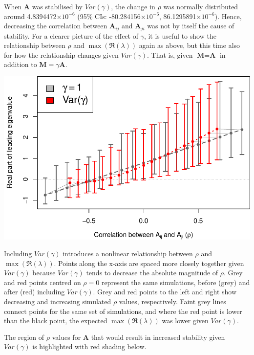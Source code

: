 \documentclass[]{article}
\begin{document}
When \(\textbf{A}\) was stabilised by \(Var(\gamma)\), the change in
\(\rho\) was normally distributed around 4.8394472\(\times 10^{-6}\)
(95\% CIs: -80.284156\(\times 10^{-6}\), 86.1295891\(\times 10^{-6}\)).
Hence, decreasing the correlation between \(\textbf{A}_{ij}\) and
\(\textbf{A}_{ji}\) was not by itself the cause of stability. For a
clearer picture of the effect of \(\gamma\), it is useful to show the
relationship between \(\rho\) and \(\max(\Re(\lambda))\) again as above,
but this time also for how the relationship changes given
\(Var(\gamma)\). That is, given \(\textbf{M} = \textbf{A}\) in addition
to \(\textbf{M} = \gamma\textbf{A}\).

\includegraphics{revision_notes_files/figure-latex/unnamed-chunk-11-1.pdf}

Including \(Var(\gamma)\) introduces a nonlinear relationship between
\(\rho\) and \(\max(\Re(\lambda))\). Points along the x-axis are spaced
more closely together given \(Var(\gamma)\) because \(Var(\gamma)\)
tends to decrease the absolute magnitude of \(\rho\). Grey and red
points centred on \(\rho = 0\) represent the same simulations, before
(grey) and after (red) including \(Var(\gamma)\). Grey and red points to
the left and right show decreasing and increasing simulated \(\rho\)
values, respectively. Faint grey lines connect points for the same set
of simulations, and where the red point is lower than the black point,
the expected \(\max(\Re(\lambda))\) was lower given \(Var(\gamma)\).

The region of \(\rho\) values for \(\textbf{A}\) that would result in
increased stability given \(Var(\gamma)\) is highlighted with red
shading below.
\end{document}
